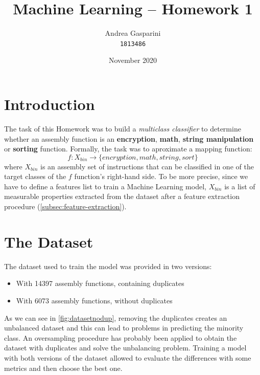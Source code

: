 \documentclass[11pt]{article}
\title{Machine Learning -- Homework 1}
\author{Andrea Gasparini \\ \texttt{1813486}}
\date{November 2020}
\begin{document}
	\maketitle

	\tableofcontents	

	\newpage



	\section{Introduction}
	The task of this Homework was to build a \textit{multiclass classifier} to
	determine whether an assembly function is an \textbf{encryption}, \textbf{math},
	\textbf{string manipulation} or \textbf{sorting} function.
	Formally, the task was to aproximate a mapping function:
	\begin{equation} \label{eq:mapping-function}
		f : X_{bin} \rightarrow \{ encryption, math, string, sort \}		
	\end{equation}
	where $ X_{bin} $ is an assembly set of instructions that can be classified
	in one of the target classes of the $ f $ function's right-hand side.
	To be more precise, since we have to define a features list to train a
	Machine Learning model, $ X_{bin} $ is a list of measurable properties
	extracted from the dataset after a feature extraction procedure
	(\autoref{subsec:feature-extraction}).



	\section{The Dataset}
	The dataset used to train the model was provided in two versions:
	\begin{itemize}
		\item With 14397 assembly functions, containing duplicates
		\item With 6073 assembly functions, without duplicates
	\end{itemize}
	As we can see in \autoref{fig:datasetnodup}, removing the duplicates creates
	an unbalanced dataset and this can lead to problems in predicting the minority
	class. An oversampling procedure has probably been applied to obtain
	the dataset with duplicates and solve the unbalancing problem.
	Training a model with both versions of the dataset allowed to evaluate the
	differences with some metrics and then choose the best one.
\end{document}
